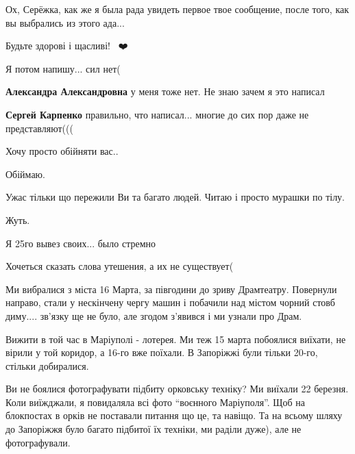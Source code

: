 
Ох, Серёжка, как же я была рада увидеть первое твое сообщение, после того, как
вы выбрались из этого ада...


Будьте здорові і щасливі!🙏🙏🙏❤️


Я потом напишу... сил нет(

\begin{itemize} %
\textbf{Александра Александровна} у меня тоже нет. Не знаю зачем я это написал

\textbf{Сергей Карпенко} правильно, что написал... многие до сих пор даже не представляют(((
\end{itemize} %


Хочу просто обійняти вас..


Обіймаю.


Ужас тільки що пережили Ви та багато людей. Читаю і просто мурашки по тілу.


Жуть.


Я 25го вывез своих... было стремно


Хочеться сказать слова утешения, а их не существует(


Ми вибралися з міста 16 Марта, за півгодини до зриву Драмтеатру. Повернули
направо, стали у нескінчену чергу машин і побачили над містом чорний стовб
диму.... зв'язку ще не було, але згодом з'явився і ми узнали про Драм.


Вижити в той час в Маріуполі - лотерея. Ми теж 15 марта побоялися виїхати, не
вірили у той коридор, а 16-го вже поїхали. В Запоріжжі були тільки 20-го,
стільки добиралися.


Ви не боялися фотографувати підбиту орковську техніку? Ми виїхали 22 березня.
Коли виїжджали, я повидаляла всі фото \enquote{воєнного Маріуполя}. Щоб на блокпостах в
орків не поставали питання що це, та навіщо. Та на всьому шляху до Запоріжжя
було багато підбитої їх техніки, ми раділи дуже), але не фотографували.
